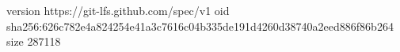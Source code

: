 version https://git-lfs.github.com/spec/v1
oid sha256:626c782e4a824254e41a3c7616c04b335de191d4260d38740a2eed886f86b264
size 287118
